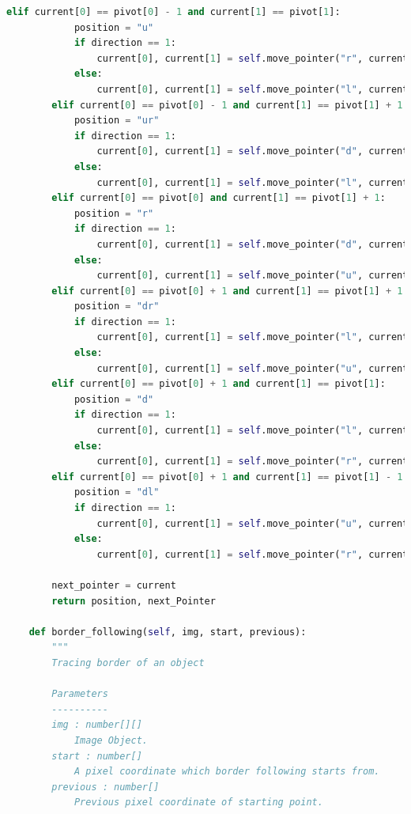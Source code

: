 \begin{lstlisting}[language=Python,basicstyle=\tiny]        
        elif current[0] == pivot[0] - 1 and current[1] == pivot[1]:
            position = "u"
            if direction == 1:
                current[0], current[1] = self.move_pointer("r", current[0], current[1])
            else:
                current[0], current[1] = self.move_pointer("l", current[0], current[1])
        elif current[0] == pivot[0] - 1 and current[1] == pivot[1] + 1:
            position = "ur"
            if direction == 1:
                current[0], current[1] = self.move_pointer("d", current[0], current[1])
            else:
                current[0], current[1] = self.move_pointer("l", current[0], current[1])
        elif current[0] == pivot[0] and current[1] == pivot[1] + 1:
            position = "r"
            if direction == 1:
                current[0], current[1] = self.move_pointer("d", current[0], current[1])
            else:
                current[0], current[1] = self.move_pointer("u", current[0], current[1])
        elif current[0] == pivot[0] + 1 and current[1] == pivot[1] + 1:
            position = "dr"
            if direction == 1:
                current[0], current[1] = self.move_pointer("l", current[0], current[1])
            else:
                current[0], current[1] = self.move_pointer("u", current[0], current[1])
        elif current[0] == pivot[0] + 1 and current[1] == pivot[1]:
            position = "d"
            if direction == 1:
                current[0], current[1] = self.move_pointer("l", current[0], current[1])
            else:
                current[0], current[1] = self.move_pointer("r", current[0], current[1])
        elif current[0] == pivot[0] + 1 and current[1] == pivot[1] - 1:
            position = "dl"
            if direction == 1:
                current[0], current[1] = self.move_pointer("u", current[0], current[1])
            else:
                current[0], current[1] = self.move_pointer("r", current[0], current[1])

        next_pointer = current
        return position, next_Pointer

    def border_following(self, img, start, previous):
        """
        Tracing border of an object
        
        Parameters
        ----------
        img : number[][]
            Image Object.
        start : number[]
            A pixel coordinate which border following starts from.
        previous : number[]
            Previous pixel coordinate of starting point.


\end{lstlisting}
